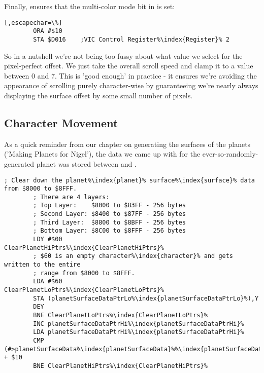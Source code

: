 Finally,  ensures that the multi-color mode bit in  is set:

\begin{lstlisting}[,escapechar=\%]
        ORA #$10
        STA $D016    ;VIC Control Register%\index{Register}% 2
\end{lstlisting}

So in a nutshell we're not being too fussy about what value we select for the pixel-perfect offset. We
just take the overall scroll speed and clamp it to a value between 0 and 7. This is 'good enough' in 
practice - it ensures we're avoiding the appearance of scrolling purely character-wise by guaranteeing
we're nearly always displaying the surface offset by some small number of pixels.

\subsection{Character Movement}

As a quick reminder from our chapter on generating the surfaces of the planets ('Making Planets for Nigel'),
the data we came up with for the ever-so-randomly-generated planet was stored between  and .

\begin{lstlisting}[escapechar=\%,caption=The surface\index{surface} data is stored from \icode{\$8000} to \icode{\$8FFF}. This code overwrites it all with 
the value \$60\, which is an empty bitmap.]
        ; Clear down the planet%\index{planet}% surface%\index{surface}% data from $8000 to $8FFF.
        ; There are 4 layers:
        ; Top Layer:    $8000 to $83FF - 256 bytes 
        ; Second Layer: $8400 to $87FF - 256 bytes 
        ; Third Layer:  $8800 to $8BFF - 256 bytes 
        ; Bottom Layer: $8C00 to $8FFF - 256 bytes 
        LDY #$00
ClearPlanetHiPtrs%\index{ClearPlanetHiPtrs}%   
        ; $60 is an empty character%\index{character}% and gets written to the entire
        ; range from $8000 to $8FFF.
        LDA #$60
ClearPlanetLoPtrs%\index{ClearPlanetLoPtrs}%   
        STA (planetSurfaceDataPtrLo%\index{planetSurfaceDataPtrLo}%),Y
        DEY
        BNE ClearPlanetLoPtrs%\index{ClearPlanetLoPtrs}%
        INC planetSurfaceDataPtrHi%\index{planetSurfaceDataPtrHi}%
        LDA planetSurfaceDataPtrHi%\index{planetSurfaceDataPtrHi}%
        CMP (#>planetSurfaceData%\index{planetSurfaceData}%%\index{planetSurfaceData%\index{planetSurfaceData}%}%) + $10
        BNE ClearPlanetHiPtrs%\index{ClearPlanetHiPtrs}%
\end{lstlisting}

